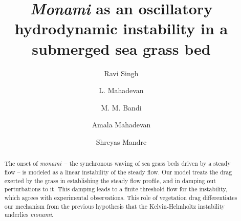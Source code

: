 \documentclass[aps,prl,twocolumn,superscriptaddress,10pt]{revtex4-1}  %
\newcommand{\monami}{\textit{monami}}
\begin{document}
\title{\textit{Monami} as an oscillatory hydrodynamic instability in a submerged sea grass bed}
\author{Ravi Singh}
\author{L. Mahadevan}
\author{M. M. Bandi}
\author{Amala Mahadevan}
\author{Shreyas Mandre}

\begin{abstract}
The onset of \monami ~-- the synchronous waving of sea grass beds driven by a steady flow -- is modeled as a linear instability of the steady flow. Our model treats the drag exerted by the grass in establishing the steady flow profile, and in damping out perturbations to it. This damping leads to a finite threshold flow for the instability, which agrees with experimental observations. This role of vegetation drag differentiates our mechanism from the previous hypothesis that the Kelvin-Helmholtz instability underlies \monami.
\end{abstract}
\end{document}
